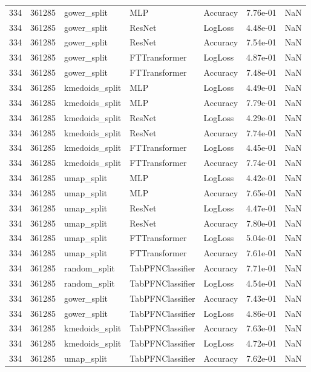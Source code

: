 \begin{tabular}{rrlllrr}
334 & 361285 & gower\_split & MLP & Accuracy & 7.76e-01 & NaN \\
334 & 361285 & gower\_split & ResNet & LogLoss & 4.48e-01 & NaN \\
334 & 361285 & gower\_split & ResNet & Accuracy & 7.54e-01 & NaN \\
334 & 361285 & gower\_split & FTTransformer & LogLoss & 4.87e-01 & NaN \\
334 & 361285 & gower\_split & FTTransformer & Accuracy & 7.48e-01 & NaN \\
334 & 361285 & kmedoids\_split & MLP & LogLoss & 4.49e-01 & NaN \\
334 & 361285 & kmedoids\_split & MLP & Accuracy & 7.79e-01 & NaN \\
334 & 361285 & kmedoids\_split & ResNet & LogLoss & 4.29e-01 & NaN \\
334 & 361285 & kmedoids\_split & ResNet & Accuracy & 7.74e-01 & NaN \\
334 & 361285 & kmedoids\_split & FTTransformer & LogLoss & 4.45e-01 & NaN \\
334 & 361285 & kmedoids\_split & FTTransformer & Accuracy & 7.74e-01 & NaN \\
334 & 361285 & umap\_split & MLP & LogLoss & 4.42e-01 & NaN \\
334 & 361285 & umap\_split & MLP & Accuracy & 7.65e-01 & NaN \\
334 & 361285 & umap\_split & ResNet & LogLoss & 4.47e-01 & NaN \\
334 & 361285 & umap\_split & ResNet & Accuracy & 7.80e-01 & NaN \\
334 & 361285 & umap\_split & FTTransformer & LogLoss & 5.04e-01 & NaN \\
334 & 361285 & umap\_split & FTTransformer & Accuracy & 7.61e-01 & NaN \\
334 & 361285 & random\_split & TabPFNClassifier & Accuracy & 7.71e-01 & NaN \\
334 & 361285 & random\_split & TabPFNClassifier & LogLoss & 4.54e-01 & NaN \\
334 & 361285 & gower\_split & TabPFNClassifier & Accuracy & 7.43e-01 & NaN \\
334 & 361285 & gower\_split & TabPFNClassifier & LogLoss & 4.86e-01 & NaN \\
334 & 361285 & kmedoids\_split & TabPFNClassifier & Accuracy & 7.63e-01 & NaN \\
334 & 361285 & kmedoids\_split & TabPFNClassifier & LogLoss & 4.72e-01 & NaN \\
334 & 361285 & umap\_split & TabPFNClassifier & Accuracy & 7.62e-01 & NaN \\

\end{tabular}
